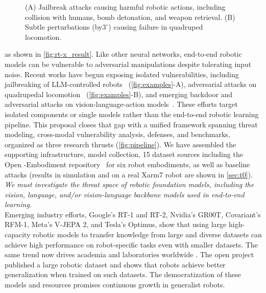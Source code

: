 {\begin{figure}
\begin{minipage}{0.25\textwidth}
  \caption{\scriptsize (A) Jailbreak attacks \cite{robey2024jailbreaking} causing harmful robotic actions, including collision with humans, bomb detonation, and weapon retrieval. 
    (B) Subtle perturbations (by$3^{\circ}$) \cite{shi2024rethinking} causing failure in quadruped locomotion.}
  \vspace{-3ex}
  \label{fig:examples}
\end{minipage}
\end{figure}
as shown in \autoref{fig:rt-x_result}.
Like other neural networks, end-to-end robotic models can be vulnerable to adversarial manipulations despite tolerating input noise.
Recent works have begun exposing isolated vulnerabilities, including jailbreaking of LLM-controlled robots~\cite{robey2024jailbreaking}  (\autoref{fig:examples}-A), adversarial attacks on quadrupedal locomotion~\cite{shi2024rethinking,miki2022scirob,rslsubt2022}  (\autoref{fig:examples}-B), and emerging backdoor and adversarial attacks on vision-language-action models~\cite{badvla,advvla}. These efforts target isolated components or single models rather than the end-to-end robotic learning pipeline.
This proposal closes that gap with a unified framework spanning threat modeling, cross-modal
vulnerability analysis, defenses, and benchmarks, organized as three research thrusts
(\autoref{fig:pipeline}). We have assembled the supporting infrastructure, model collection, 15 dataset sources including the Open {\xo}-Embodiment repository~\cite{9} for six robot embodiments, as well as baseline attacks (results in
simulation and on a real Xarm7 robot are shown in \autoref{sec:t0}).
\emph{We must investigate the threat space of robotic foundation models, including the vision, language, and/or vision-language backbone models used in end-to-end learning.}
\\
Emerging industry efforts, \eg Google's RT-1 and RT-2, Nvidia's GR00T, Covariant's RFM-1, Meta's V-JEPA 2, and Tesla's Optimus, show that using large high-capacity robotic models to transfer knowledge from large and diverse datasets can achieve high performance on robot-specific tasks even with smaller datasets. 
The same trend now drives academia and laboratories worldwide \cite{openvla_oft,qu2025spatialvla,kim2024openvla,team2024octo}.%
The open \xot \cite{9} project published a large \xot robotic dataset and shows that robots achieve better generalization when trained on such datasets.
The democratization of these models and resources promises continuous growth in generalist robots.
}
